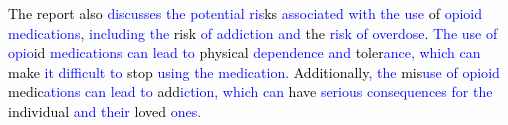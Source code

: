 \begin{tcolorbox}
  \textcolor{black}{The} \textcolor{black}{report} \textcolor{black}{also} \textcolor{blue}{discuss}\textcolor{blue}{es} \textcolor{blue}{the} \textcolor{blue}{potential} \textcolor{blue}{ris}\textcolor{black}{ks} \textcolor{blue}{associated} \textcolor{blue}{with} \textcolor{blue}{the} \textcolor{blue}{use} \textcolor{black}{of} \textcolor{blue}{op}\textcolor{blue}{io}\textcolor{blue}{id} \textcolor{blue}{medic}\textcolor{blue}{ations}\textcolor{black}{,} \textcolor{blue}{including} \textcolor{blue}{the} \textcolor{black}{risk} \textcolor{blue}{of} \textcolor{blue}{add}\textcolor{blue}{iction} \textcolor{blue}{and} \textcolor{black}{the} \textcolor{blue}{risk} \textcolor{blue}{of} \textcolor{blue}{over}\textcolor{blue}{d}\textcolor{blue}{ose}\textcolor{black}{.} \textcolor{blue}{The} \textcolor{blue}{use} \textcolor{blue}{of} \textcolor{blue}{op}\textcolor{blue}{io}\textcolor{black}{id} \textcolor{blue}{medic}\textcolor{blue}{ations} \textcolor{blue}{can} \textcolor{blue}{lead} \textcolor{blue}{to} \textcolor{black}{physical} \textcolor{blue}{dependence} \textcolor{blue}{and} \textcolor{black}{toler}\textcolor{blue}{ance}\textcolor{blue}{,} \textcolor{blue}{which} \textcolor{blue}{can} \textcolor{black}{make} \textcolor{blue}{it} \textcolor{blue}{difficult} \textcolor{blue}{to} \textcolor{black}{stop} \textcolor{blue}{using} \textcolor{blue}{the} \textcolor{blue}{medic}\textcolor{blue}{ation}\textcolor{blue}{.} \textcolor{black}{Additionally}\textcolor{blue}{,} \textcolor{blue}{the} \textcolor{black}{mis}\textcolor{blue}{use} \textcolor{blue}{of} \textcolor{blue}{op}\textcolor{blue}{io}\textcolor{blue}{id} \textcolor{black}{medic}\textcolor{blue}{ations} \textcolor{blue}{can} \textcolor{blue}{lead} \textcolor{blue}{to} \textcolor{black}{add}\textcolor{blue}{iction}\textcolor{blue}{,} \textcolor{blue}{which} \textcolor{blue}{can} \textcolor{black}{have} \textcolor{blue}{serious} \textcolor{blue}{consequences} \textcolor{blue}{for} \textcolor{blue}{the} \textcolor{black}{individual} \textcolor{blue}{and} \textcolor{blue}{their} \textcolor{black}{loved} \textcolor{blue}{ones}\textcolor{blue}{.}
  

\end{tcolorbox}

